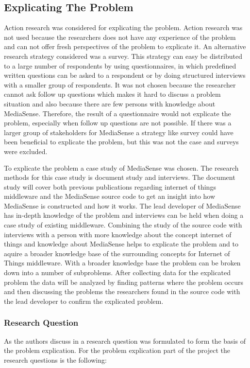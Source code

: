 \subsection{Explicating The Problem}
Action research was considered for explicating the problem. Action research was not used because the researchers does not have any experience of the problem and can not offer fresh perspectives of the problem to explicate it. An alternative research strategy considered was a survey. This strategy can easy be distributed to a large number of respondents by using questionnaires, in which predefined written questions can be asked to a respondent or by doing structured interviews with a smaller group of respondents. It was not chosen because the researcher cannot ask follow up questions which makes it hard to discuss a problem situation and also because there are few persons with knowledge about MediaSense. Therefore, the result of a questionnaire would not explicate the problem, especially when follow up questions are not possible. If there was a larger group of stakeholders for MediaSense a strategy like survey could have been beneficial to explicate the problem, but this was not the case and surveys were excluded.

To explicate the problem a case study of MediaSense was chosen. The research methods for this case study is document study and interviews. The document study will cover both previous publications regarding internet of things middleware and the MediaSense source code to get an insight into how MediaSense is constructed and how it works. The lead developer of MediaSense has in-depth knowledge of the problem and interviews can be held when doing a case study of existing middleware. Combining the study of the source code with interviews with a person with more knowledge about the concept internet of things and knowledge about MediaSense helps to explicate the problem and to aquire a broader knowledge base of the surrounding concepts for Internet of Things middleware. With a broader knowledge base the problem can be broken down into a number of subproblems. After collecting data for the explicated problem the data will be analyzed by finding patterns where the problem occurs and then discussing the problems the researchers found in the source code with the lead developer to confirm the explicated problem. 

\subsubsection{Research Question}
As the authors discuss in \cite{johannesson2012design} a research question was formulated to form the basis of the problem explication. For the problem explication part of the project the research questions is the following: 

